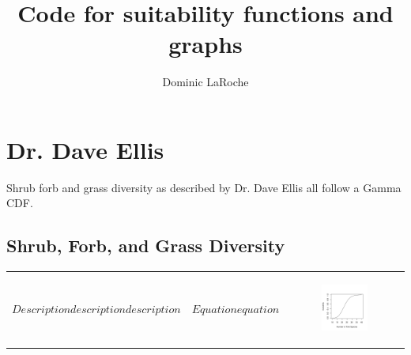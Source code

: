 \documentclass[12pt,letterpaper]{article}\usepackage{graphicx, color}
\title{Code for suitability functions and graphs}
\author{Dominic LaRoche}
\makeatletter
\def\maxwidth{ %
  \ifdim\Gin@nat@width>\linewidth
    \linewidth
  \else
    \Gin@nat@width
  \fi
}
\newenvironment{knitrout}{}{} %
\makeatother
\begin{document}
\maketitle





\section{Dr. Dave Ellis}
Shrub forb and grass diversity as described by Dr. Dave Ellis all follow a Gamma CDF.\\ 
\subsection{Shrub, Forb, and Grass Diversity}
\begin{center}
\begin{tabular}{p{}cc}
$Description 
description 
description$ & $Equation
equation$ & \begin{figure}
\begin{knitrout}
\definecolor{shadecolor}{rgb}{0.969, 0.969, 0.969}\color{fgcolor}\includegraphics[width=\maxwidth]{figure/Ellis_Forb_diversity} 
\end{knitrout}


\end{figure}
\end{tabular}
\end{center}
\end{document}
